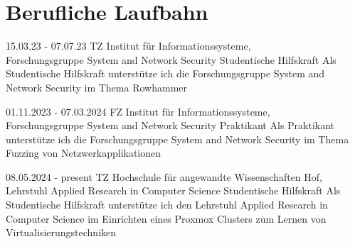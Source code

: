 \section{Berufliche Laufbahn}



\jobentry
{15.03.23 - 07.07.23} %
{TZ} %
{Institut für Informationssysteme, \\ Forschungsgruppe System and Network Security \newline} %
{Studentische Hilfskraft} %
{Als Studentische Hilfskraft unterstütze ich die Forschungsgruppe \newline System and Network Security im Thema Rowhammer} %

\jobentry
{01.11.2023 - 07.03.2024}
{FZ}
{Institut für Informationssysteme, \\ Forschungsgruppe System and Network Security \newline}
{Praktikant}
{Als Praktikant unterstütze ich die Forschungsgruppe System and Network Security im Thema Fuzzing von Netzwerkapplikationen}

\jobentry
{08.05.2024 - present}
{TZ}
{Hochschule für angewandte Wissenschaften Hof, \\ Lehrstuhl Applied Research in Computer Science \newline}
{Studentische Hilfskraft}
{Als Studentische Hilfskraft unterstütze ich den Lehrstuhl Applied Research in Computer Science im Einrichten eines
Proxmox Clusters zum Lernen von Virtualisierungstechniken}
